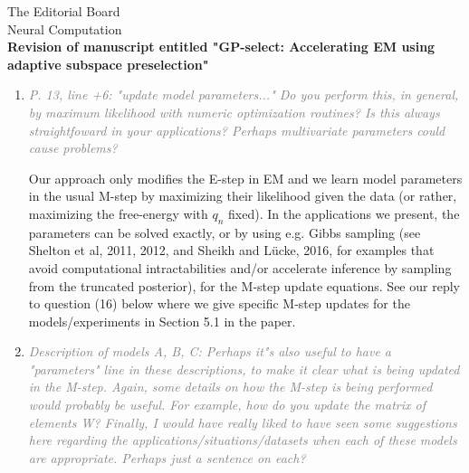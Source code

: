\documentclass[10pt]{letter}
\newcommand{\rvr}[1]{\textcolor{gray}{#1}}
\begin{document}
\begin{letter}{
The Editorial Board\\
Neural Computation\\
\vspace{10mm}
\textbf{Revision of manuscript entitled "GP-select: Accelerating EM using adaptive
subspace preselection"}
}
\begin{enumerate}[topsep=3pt,itemsep=2ex,partopsep=1ex,parsep=1ex]
    
    Indeed, this is a subtle point, and one we should have been clearer about: we do not use a sigmoid link, but merely do a GP regression of the expected indicator of $s$. This is, of course, not a good estimate of a probability (it can be negative, or greater than one), and we will emphasize this. From the selection perspective, however, it's not really necessary to avoid these pathologies, and to use a sigmoid squashing function, as we only want an ordering of the variables. As you point out, GP classification with a properly defined likelihood will no longer have a marginal Gaussian distribution, and we would no longer be able to trivially express the posterior means of different functions with the same inputs, without considerable extra computation.

See our reply to Reviewer 2, in point (1), who also had questions about this topic.

    \item \rvr{\emph{P. 13, line +6: "update model parameters..."  Do you perform this, in general, by maximum likelihood with numeric optimization routines? Is this always straightfoward in your applications? Perhaps multivariate parameters could cause problems?}}

Our approach only modifies the E-step in EM and we learn model parameters in the usual M-step by maximizing their likelihood given the data (or rather, maximizing the free-energy with $q_n$ fixed). 
In the applications we present, the parameters can be solved exactly, or by using e.g. Gibbs sampling (see Shelton et al, 2011, 2012, and Sheikh and L\"ucke, 2016, for examples that avoid computational intractabilities and/or accelerate inference by sampling from the truncated posterior), for the M-step update equations. See our reply to question (16) below where we give specific M-step updates for the models/experiments in Section 5.1 in the paper.

    \item \rvr{\emph{Description of models A, B, C: Perhaps it"s also useful to have a "parameters"  line in these descriptions, to make it clear what is being updated in the M-step. Again, some details on how the M-step is being performed would probably be useful. For example, how do you update the matrix of elements W? Finally, I would have really liked to have seen some suggestions here regarding the applications/situations/datasets when each of these models are appropriate. Perhaps just a sentence on each?}}


\end{enumerate}
\end{letter}
\end{document}
